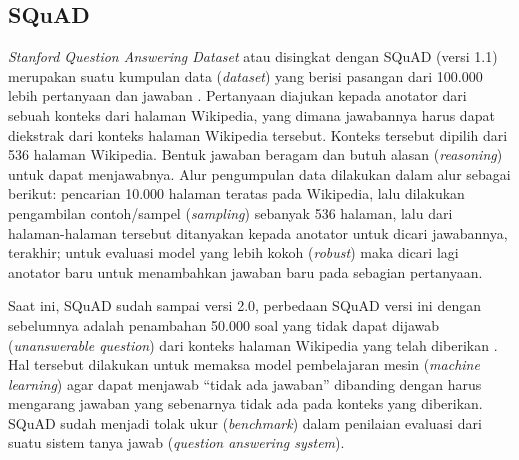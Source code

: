 \subsection{SQuAD}
\label{2.2.1}
\emph{Stanford Question Answering Dataset} atau disingkat dengan SQuAD (versi 1.1) merupakan suatu kumpulan data (\emph{dataset}) yang berisi pasangan dari 100.000 lebih pertanyaan dan jawaban \citep{rajpurkar-etal-2016-squad}. Pertanyaan diajukan kepada anotator dari sebuah konteks dari halaman Wikipedia, yang dimana jawabannya harus dapat diekstrak dari konteks halaman Wikipedia tersebut. Konteks tersebut dipilih dari 536 halaman Wikipedia. Bentuk jawaban beragam dan butuh alasan (\emph{reasoning}) untuk dapat menjawabnya. Alur pengumpulan data dilakukan dalam alur sebagai berikut: pencarian 10.000 halaman teratas pada Wikipedia, lalu dilakukan pengambilan contoh/sampel (\emph{sampling}) sebanyak 536 halaman, lalu dari halaman-halaman tersebut ditanyakan kepada anotator untuk dicari jawabannya, terakhir; untuk evaluasi model yang lebih kokoh (\emph{robust}) maka dicari lagi anotator baru untuk menambahkan jawaban baru pada sebagian pertanyaan.

Saat ini, SQuAD sudah sampai versi 2.0, perbedaan SQuAD versi ini dengan sebelumnya adalah penambahan 50.000 soal yang tidak dapat dijawab (\emph{unanswerable question}) dari konteks halaman Wikipedia yang telah diberikan \citep{rajpurkar-etal-2018-know}. Hal tersebut dilakukan untuk memaksa model pembelajaran mesin (\emph{machine learning}) agar dapat menjawab “tidak ada jawaban” dibanding dengan harus mengarang jawaban yang sebenarnya tidak ada pada konteks yang diberikan. SQuAD sudah menjadi tolak ukur (\emph{benchmark}) dalam penilaian evaluasi dari suatu sistem tanya jawab (\emph{question answering system}).


